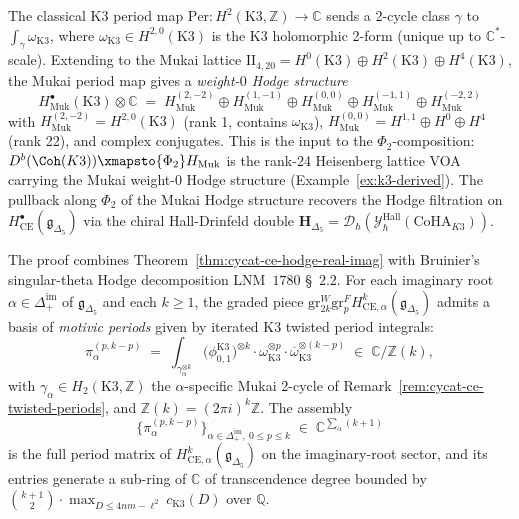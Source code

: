 \begin{remark}
\label{rem:dcy-k3-period-map-mukai}
The classical K3 period map
$\mathrm{Per}: H^2(\mathrm{K3}, \mathbb{Z}) \to \mathbb{C}$ sends a
2-cycle class $\gamma$ to $\int_\gamma \omega_{\mathrm{K3}}$, where
$\omega_{\mathrm{K3}} \in H^{2,0}(\mathrm{K3})$ is the K3 holomorphic
2-form (unique up to $\mathbb{C}^*$-scale). Extending to the Mukai
lattice $\mathrm{II}_{4,20} = H^0(\mathrm{K3}) \oplus H^2(\mathrm{K3})
\oplus H^4(\mathrm{K3})$, the Mukai period map gives a
\emph{weight-$0$ Hodge structure}
\[
 H^\bullet_{\mathrm{Muk}}(\mathrm{K3}) \otimes \mathbb{C}
 \;=\; H^{(2,-2)}_{\mathrm{Muk}} \oplus H^{(1,-1)}_{\mathrm{Muk}}
 \oplus H^{(0,0)}_{\mathrm{Muk}} \oplus H^{(-1,1)}_{\mathrm{Muk}}
 \oplus H^{(-2,2)}_{\mathrm{Muk}}
\]
with $H^{(2,-2)}_{\mathrm{Muk}} = H^{2,0}(\mathrm{K3})$ (rank 1,
contains $\omega_{\mathrm{K3}}$), $H^{(0,0)}_{\mathrm{Muk}} = H^{1,1}
\oplus H^0 \oplus H^4$ (rank 22), and complex conjugates. This is the
input to the $\Phi_2$-composition: $D^b(\Coh(K3)) \xmapsto{\Phi_2}
H_{\mathrm{Muk}}$ is the rank-24 Heisenberg lattice VOA carrying the
Mukai weight-0 Hodge structure (Example~\textup{\ref{ex:k3-derived}}).
The pullback along $\Phi_2$ of the Mukai Hodge structure recovers
the Hodge filtration on $H^\bullet_{\mathrm{CE}}(\mathfrak{g}_{\Delta_5})$
via the chiral Hall-Drinfeld double
$\mathbf{H}_{\Delta_5} = \mathcal{D}_\hbar(\mathcal{Y}^{\mathrm{Hall}}_\hbar(\mathrm{CoHA}_{K3}))$.
\end{remark}

\begin{theorem}
\label{thm:dcy-k3-twisted-periods-realise-mhs}
The proof combines Theorem~\textup{\ref{thm:cycat-ce-hodge-real-imag}}
with Bruinier's singular-theta Hodge decomposition LNM~$1780$
\S~$2.2$.
For each imaginary root $\alpha \in \Delta_+^{\mathrm{im}}$ of
$\mathfrak{g}_{\Delta_5}$ and each $k \geq 1$, the graded piece
$\mathrm{gr}^W_{2k} \mathrm{gr}^F_p H^k_{\mathrm{CE},\alpha}
(\mathfrak{g}_{\Delta_5})$ admits a basis of \emph{motivic periods}
given by iterated K3 twisted period integrals:
\[
 \pi_\alpha^{(p, k-p)} \;=\;
 \int_{\gamma_\alpha^{\otimes k}} \bigl(\phi_{0,1}^{\mathrm{K3}}\bigr)^{\otimes k}
 \cdot \omega_{\mathrm{K3}}^{\otimes p} \cdot \overline{\omega}_{\mathrm{K3}}^{\otimes (k-p)}
 \;\in\; \mathbb{C}/\mathbb{Z}(k),
\]
with $\gamma_\alpha \in H_2(\mathrm{K3}, \mathbb{Z})$ the
$\alpha$-specific Mukai 2-cycle of
Remark~\textup{\ref{rem:cycat-ce-twisted-periods}}, and
$\mathbb{Z}(k) = (2\pi i)^k \mathbb{Z}$. The assembly
\[
 \bigl\{\pi_\alpha^{(p, k-p)}\bigr\}_{\alpha \in \Delta_+^{\mathrm{im}},\ 0 \leq p \leq k}
 \;\in\; \mathbb{C}^{\sum_\alpha (k+1)}
\]
is the full period matrix of $H^k_{\mathrm{CE},\alpha}(\mathfrak{g}_{\Delta_5})$
on the imaginary-root sector, and its entries generate a sub-ring of
$\mathbb{C}$ of transcendence degree bounded by $\binom{k+1}{2}
\cdot \max_{D \leq 4nm-\ell^2} c_{\mathrm{K3}}(D)$ over $\mathbb{Q}$.
\end{theorem}

